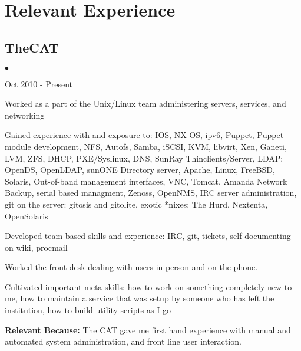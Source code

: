 \documentclass[10pt,letterpaper]{article}
\renewenvironment{itemize}{
  \begin{list}{}{
    \setlength{\leftmargin}{1.5em}
    \setlength{\itemsep}{0.25em}
    \setlength{\parskip}{0pt}
    \setlength{\parsep}{0.25em}
  }
}{
  \end{list}
}
\begin{document}
\renewenvironment{itemize}{
  \begin{list}{$\bullet$}{
    \setlength{\leftmargin}{1.5em}
    \setlength{\itemsep}{0.25em}
    \setlength{\parskip}{0pt}
    \setlength{\parsep}{0.25em}
  }
}{
  \end{list}
}
\section*{Relevant Experience}

\subsection*{TheCAT}
\begin{itemize}

    \item Oct 2010 - Present
    \item Worked as a part of the Unix/Linux team administering servers, services, and networking
    \item Gained experience with and exposure to: IOS, NX-OS, ipv6, Puppet, Puppet module development, NFS, Autofs, Samba, iSCSI, KVM, libvirt, Xen, Ganeti, LVM, ZFS, DHCP, PXE/Syslinux, DNS, SunRay Thinclients/Server, LDAP: OpenDS, OpenLDAP, sunONE Directory server, Apache, Linux, FreeBSD, Solaris, Out-of-band management interfaces, VNC, Tomcat, Amanda Network Backup, serial based managment, Zenoss, OpenNMS, IRC server administration, git on the server: gitosis and gitolite, exotic *nixes: The Hurd, Nextenta, OpenSolaris
    \item Developed team-based skills and experience: IRC, git, tickets, self-documenting on wiki, procmail
    \item Worked the front desk dealing with users in person and on the phone.
    \item Cultivated important meta skills: how to work on something completely new to me, how to maintain a service that was setup by someone who has left the institution, how to build utility scripts as I go

    \item \textbf{Relevant Because:} The CAT gave me first hand experience with manual and automated system administration, and front line user interaction.
 
\end{itemize}
\end{document}
